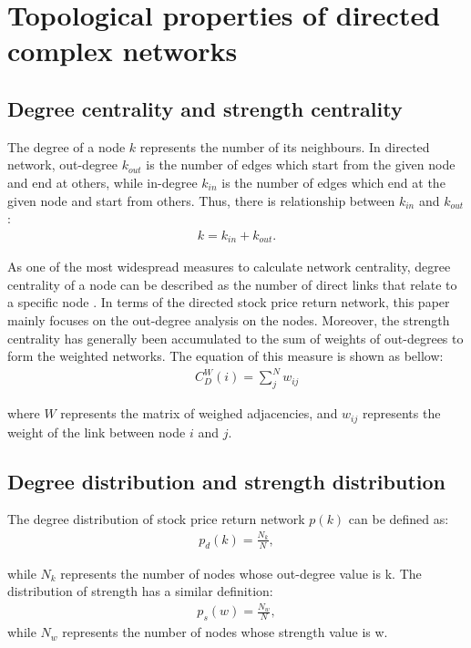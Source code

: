 \chapter[Network Topological properties]{Topological properties of directed complex networks}
\section{Degree centrality and strength centrality}
The degree of a node $k$ represents the number of its neighbours. In directed network, out-degree $k_{out}$ is the number of edges which start from the given node and end at others, while in-degree $k_{in}$ is the number of edges which end at the given node and start from others. Thus, there is relationship between $k_{in}$ and $k_{out}$:
\begin{eqnarray}
k=k_{in}+k_{out}.
\end{eqnarray}

As one of the most widespread measures to calculate network centrality, degree centrality of a node can be described as the number of direct links that relate to a specific node \cite{freeman}. In terms of the directed stock price return network, this paper mainly focuses on the out-degree analysis on the nodes. Moreover, the strength centrality has generally been accumulated to the sum of weights of out-degrees to form the weighted networks. The equation of this measure is shown as bellow:
\begin{eqnarray}
&&C_D^W(i)=\sum_{j}^{N}w_{ij}
\end{eqnarray}

where $W$ represents the matrix of weighed adjacencies, and $w_{ij}$ represents the weight of the link between node $i$ and $j$.

\section{Degree distribution and strength distribution}
The degree distribution of stock price return network $p(k)$ can be defined as:
\begin{eqnarray}
p_d(k)=\frac{N_k}{N},
\end{eqnarray}

while $N_k$ represents the number of nodes whose out-degree value is k. The distribution of strength has a similar definition:
\begin{eqnarray}
p_s(w)=\frac{N_w}{N},
\end{eqnarray}
while $N_w$ represents the number of nodes whose strength value is w.

